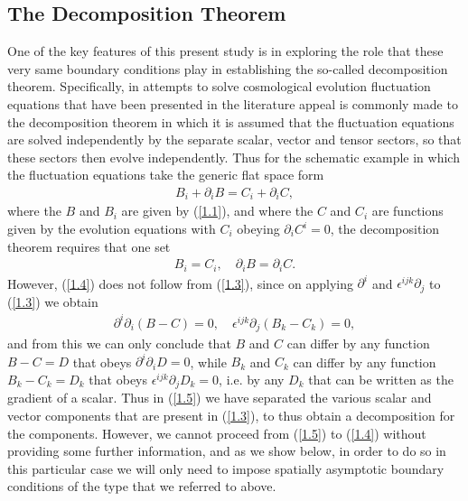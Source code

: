 \documentclass[aps,onecolumn,10pt]{revtex4}
\numberwithin{equation}{section}
\numberwithin{equation}{section}
\begin{document}
\subsection{The Decomposition Theorem}
\label{S1b}


One of the key features of this present study is in exploring the role that these very same boundary conditions play in establishing the so-called decomposition theorem. Specifically, in attempts to solve cosmological  evolution fluctuation equations that have been presented in the literature appeal is commonly made to the decomposition theorem in which it is assumed that the fluctuation equations are solved independently by the separate scalar, vector and tensor sectors, so that these sectors then evolve independently. Thus for the schematic example in which the fluctuation equations  take the generic flat space form
%
\begin{eqnarray}
B_i+\partial_iB=C_i+\partial_iC,
\label{1.3}
\end{eqnarray}
%
where the $B$ and $B_i$ are given by (\ref{1.1}), and where the $C$ and $C_i$ are functions given by the evolution equations with $C_i$ obeying  $\partial_iC^i=0$, the decomposition theorem requires that one set
%
\begin{eqnarray}
B_i= C_i,\quad \partial_iB=\partial_iC.
\label{1.4}
\end{eqnarray}
%
However, (\ref{1.4}) does not follow from (\ref{1.3}), since on applying $\partial^i$ and $\epsilon^{ijk}\partial_j$  to (\ref{1.3}) we obtain 
%
\begin{eqnarray}
\partial^i\partial_i(B-C)=0,\quad \epsilon^{ijk}\partial_j(B_k-C_k)=0,
\label{1.5}
\end{eqnarray}
%
and from this we can only conclude that $B$ and $C$ can differ by any function $B-C=D$ that obeys $\partial^i\partial_iD=0$, while $B_k$ and $C_k$ can differ by any function $B_k-C_k=D_k$ that obeys $\epsilon^{ijk}\partial_jD_k=0$, i.e. by any $D_k$ that can be written as the gradient of a scalar. Thus in (\ref{1.5}) we have separated the various scalar and vector components that are present in (\ref{1.3}), to thus obtain a decomposition for the components. However, we cannot proceed from (\ref{1.5}) to (\ref{1.4}) without providing some further information, and as we show below, in order to do so in this particular case we will only need to impose spatially asymptotic boundary conditions of the type that we referred to above.
\end{document}
